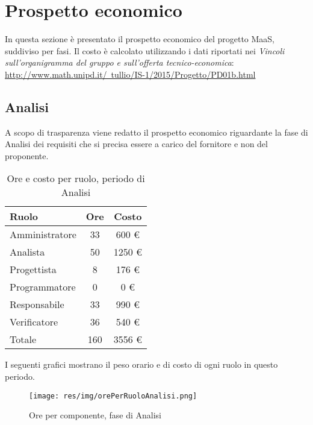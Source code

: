 \section{Prospetto economico}
In questa sezione è presentato il prospetto economico del progetto MaaS, suddiviso per fasi. Il costo è calcolato utilizzando i dati
riportati nei \textit{Vincoli sull’organigramma del gruppo e sull’offerta tecnico-economica}:
\href{http://www.math.unipd.it/~tullio/IS-1/2015/Progetto/PD01b.html}{http://www.math.unipd.it/~tullio/IS-1/2015/Progetto/PD01b.html}


\subsection{Analisi}
A scopo di trasparenza viene redatto il prospetto economico riguardante la fase di Analisi dei requisiti che si precisa essere a carico del fornitore e non del proponente.

\begin{table}[H]
	\centering
	\begin{tabular}{ l c c }
		\textbf{Ruolo} & \textbf{Ore} & \textbf{Costo} \\
		\hline
		Amministratore & 33 & 600 \euro \\
		Analista & 50 & 1250 \euro \\
		Progettista & 8 & 176 \euro \\
		Programmatore & 0 & 0 \euro \\
		Responsabile & 33 & 990 \euro \\
		Verificatore & 36 & 540 \euro \\
		\hline
		Totale & 160 & 3556 \euro \\
		\hline
	\end{tabular}
	\caption{Ore e costo per ruolo, periodo di Analisi}
\end{table}

I seguenti grafici mostrano il peso orario e di costo di ogni ruolo in questo periodo.

\begin{figure}[H]
  \begin{center}
    \texttt{[image: res/img/orePerRuoloAnalisi.png]}
  \caption{Ore per componente, fase di Analisi}
  \end{center} 
\end{figure}  

